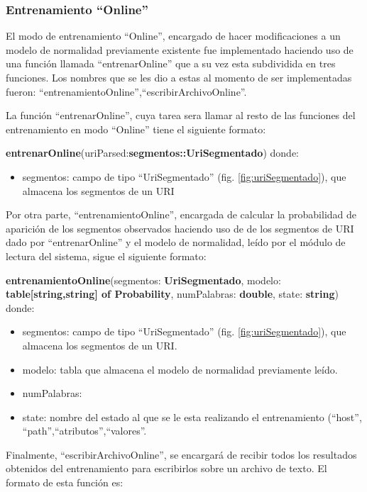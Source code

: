 \subsubsection{Entrenamiento ``Online''}

El modo de entrenamiento ``Online'', encargado de hacer modificaciones a un modelo de normalidad previamente existente fue implementado
haciendo uso de una función llamada ``entrenarOnline'' que a su vez esta
subdividida en tres funciones. Los
nombres que se les dio a estas al momento de ser implementadas fueron:
``entrenamientoOnline'',``escribirArchivoOnline''.

La función ``entrenarOnline'', cuya tarea sera llamar al resto de las funciones del entrenamiento en modo ``Online'' tiene el siguiente formato:

\textbf{entrenarOnline}(uriParsed:\textbf{segmentos::UriSegmentado})
donde:

\begin{itemize}
\item segmentos: campo de tipo ``UriSegmentado'' (fig. \ref{fig:uriSegmentado}), que almacena
los segmentos de un URI
\end{itemize}

Por otra parte, ``entrenamientoOnline'', encargada de calcular la probabilidad de aparición de los segmentos observados haciendo uso de de los segmentos de URI dado por ``entrenarOnline'' y el modelo de normalidad, leído por el módulo de lectura del sistema, sigue el siguiente formato:

\textbf{entrenamientoOnline}(segmentos: \textbf{UriSegmentado},
modelo: \textbf{table[string,string] of Probability}, numPalabras: \textbf{double}, state: \textbf{string})
donde:
\begin{itemize}
\item segmentos: campo de tipo ``UriSegmentado'' (fig. \ref{fig:uriSegmentado}), que almacena los segmentos de un URI.
\item modelo: tabla que almacena el modelo de normalidad previamente
leído.
\item numPalabras:
\item state: nombre del estado al que se le esta realizando el entrenamiento
(``host'',\\``path'',``atributos'',``valores''.
\end{itemize}

Finalmente, ``escribirArchivoOnline'', se encargará de recibir todos los
resultados obtenidos del entrenamiento para escribirlos sobre un archivo de
texto. El formato de esta función es:

